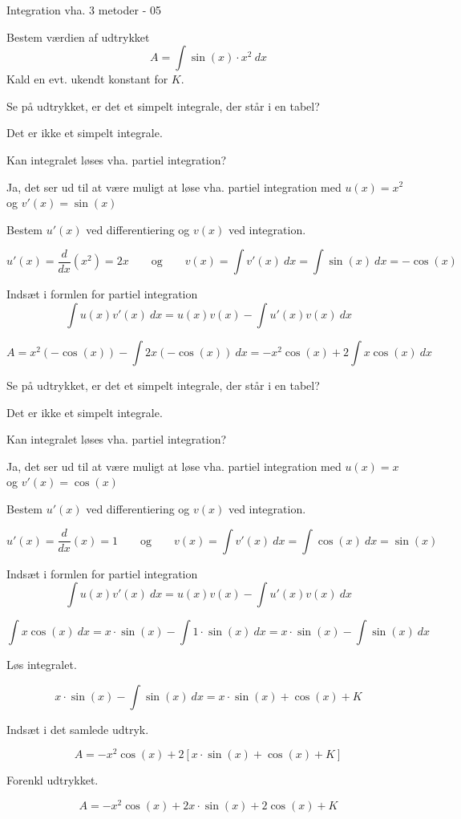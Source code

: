 \documentclass{article}
\begin{document}
\newpage

\begin{exercise}{Integration vha. 3 metoder - 05}
	
	Bestem værdien af udtrykket
	\[
	A = \int \sin(x)\cdot x^2 \ dx
	\]
	Kald en evt. ukendt konstant for $K$.
	
	
	\hint
	Se på udtrykket, er det et simpelt integrale, der står i en tabel?
	
	\hint
	Det er ikke et simpelt integrale.
	
	\hint
	Kan integralet løses vha. partiel integration?
	
	\hint
	Ja, det ser ud til at være muligt at løse vha. partiel integration med $u(x)=x^2$ og $v'(x)=\sin(x)$
	
	\hint
	Bestem $u'(x)$ ved differentiering og $v(x)$ ved integration.
	
	\hint
	\[
	u'(x) = \frac{d}{dx} \left( x^2 \right) = 2x \qquad \textrm{og} \qquad v(x) = \int v'(x) \ dx = \int \sin(x) \ dx = -\cos(x)
	\]	
	
	\hint
	Indsæt i formlen for partiel integration
	\[
	\int u(x) v'(x) \ dx = u(x) v(x)  - \int u'(x) v(x) \ dx
	\]
	
	\hint
	\[
	A = x^2 (-\cos(x)) - \int  2x (-\cos(x)) \ dx = -x^2 \cos(x) + 2 \int x \cos(x) \ dx
	\]
	
	\hint
	Se på udtrykket, er det et simpelt integrale, der står i en tabel?
	
	\hint
	Det er ikke et simpelt integrale.
	
	\hint
	Kan integralet løses vha. partiel integration?
	
	\hint
	Ja, det ser ud til at være muligt at løse vha. partiel integration med $u(x)=x$ og $v'(x)=\cos(x)$
	
	\hint
	Bestem $u'(x)$ ved differentiering og $v(x)$ ved integration.
	
	\hint
	\[
	u'(x) = \frac{d}{dx} \left( x \right) = 1 \qquad \textrm{og} \qquad v(x) = \int v'(x) \ dx = \int \cos(x) \ dx = \sin(x)
	\]	
	
	\hint
	Indsæt i formlen for partiel integration
	\[
	\int u(x) v'(x) \ dx = u(x) v(x)  - \int u'(x) v(x) \ dx
	\]
	
	\hint
	\[
	\int x \cos(x) \ dx = x \cdot \sin(x) - \int 1 \cdot \sin(x) \ dx = x \cdot \sin(x) - \int \sin(x) \ dx 
	\]
	
	\hint
	Løs integralet.
	
	\hint
	\[
	x \cdot \sin(x) - \int \sin(x) \ dx  = x \cdot \sin(x) + \cos(x) + K	
	\]
	
	\hint
	Indsæt i det samlede udtryk.
	
	\hint
	\[
	A =  -x^2 \cos(x) + 2 \left[x \cdot \sin(x) + \cos(x) + K  \right]
	\]
	
	\hint
	Forenkl udtrykket.
	
	\hint
	\[
	A = -x^2 \cos(x) + 2x \cdot \sin(x) + 2\cos(x) + K
	\]
	
	
\end{exercise}
\end{document}
